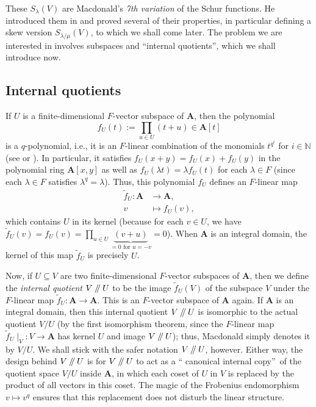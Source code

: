 \documentclass[numbers=enddot,12pt,final,onecolumn,notitlepage]{scrartcl}%
\numberwithin{exer}{section}
\theoremstyle{definition}
\let\prodnonlimits\prod
\renewcommand{\prod}{\prodnonlimits\limits}
\newcommand{\sslash}{\mathbin{/\mkern-5mu/}}
\theoremstyle{plainsl}
\begin{document}
These $S_{\lambda}\left(  V\right)  $ are Macdonald's \emph{7th variation} of
the Schur functions. He introduced them in \cite[7th Variation]{Macdon92} and
proved several of their properties, in particular defining a skew version
$S_{\lambda/\mu}\left(  V\right)  $, to which we shall come later. The problem
we are interested in involves subspaces and \textquotedblleft internal
quotients\textquotedblright, which we shall introduce now.

\subsection{Internal quotients}

If $U$ is a finite-dimensional $F$-vector subspace of $\mathbf{A}$, then the
polynomial%
\[
f_{U}\left(  t\right)  :=\prod_{u\in U}\left(  t+u\right)  \in\mathbf{A}%
\left[  t\right]
\]
is a $q$-polynomial, i.e., it is an $F$-linear combination of the monomials
$t^{q^{i}}$ for $i\in\mathbb{N}$ (see \cite[(7.7) and (7.8)]{Macdon92} or
\cite[Theorem 1.6]{ppoly}). In particular, it satisfies $f_{U}\left(
x+y\right)  =f_{U}\left(  x\right)  +f_{U}\left(  y\right)  $ in the
polynomial ring $\mathbf{A}\left[  x,y\right]  $ as well as $f_{U}\left(
\lambda t\right)  =\lambda f_{U}\left(  t\right)  $ for each $\lambda\in F$
(since each $\lambda\in F$ satisfies $\lambda^{q}=\lambda$). Thus, this
polynomial $f_{U}$ defines an $F$-linear map%
\begin{align*}
\widetilde{f}_{U}:\mathbf{A}  &  \rightarrow\mathbf{A},\\
v  &  \mapsto f_{U}\left(  v\right)  ,
\end{align*}
which contains $U$ in its kernel (because for each $v\in U$, we have
$\widetilde{f}_{U}\left(  v\right)  =f_{U}\left(  v\right)  =\prod_{u\in
U}\underbrace{\left(  v+u\right)  }_{=0\text{ for }u=-v}=0$). When
$\mathbf{A}$ is an integral domain, the kernel of this map $\widetilde{f}_{U}$
is precisely $U$.

Now, if $U\subseteq V$ are two finite-dimensional $F$-vector subspaces of
$\mathbf{A}$, then we define the \emph{internal quotient} $V\sslash U$ to be
the image $\widetilde{f}_{U}\left(  V\right)  $ of the subspace $V$ under the
$F$-linear map $\widetilde{f}_{U}:\mathbf{A}\rightarrow\mathbf{A}$. This is an
$F$-vector subspace of $\mathbf{A}$ again. If $\mathbf{A}$ is an integral
domain, then this internal quotient $V\sslash U$ is isomorphic to the actual
quotient $V/U$ (by the first isomorphism theorem, since the $F$-linear map
$\left.  \widetilde{f}_{U}\mid_{V}\right.  :V\rightarrow\mathbf{A}$ has kernel
$U$ and image $V\sslash U$); thus, Macdonald simply denotes it by $V/U$. We
shall stick with the safer notation $V\sslash U$, however. Either way, the
design behind $V\sslash U$ is for $V\sslash U$ to act as a \textquotedblleft
canonical internal copy\textquotedblright\ of the quotient space $V/U$ inside
$\mathbf{A}$, in which each coset of $U$ in $V$ is replaced by the product of
all vectors in this coset. The magic of the Frobenius endomorphism $v\mapsto
v^{q}$ ensures that this replacement does not disturb the linear structure.
\end{document}
